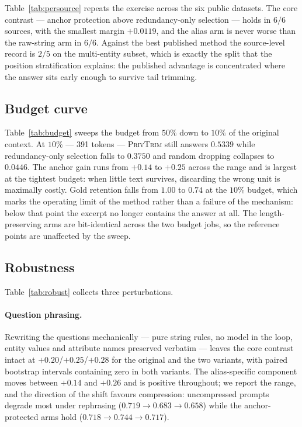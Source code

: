 \documentclass[conference]{IEEEtran}
\newcommand{\ours}{\textsc{PrivTrim}}
\begin{document}
Table~\ref{tab:persource} repeats the exercise across the six public datasets. The core
contrast --- anchor protection above redundancy-only selection --- holds in $6/6$ sources, with
the smallest margin $+0.0119$, and the alias arm is never worse than the raw-string arm in
$6/6$. Against the best published method the source-level record is $2/5$ on the multi-entity
subset, which is exactly the split that the position stratification explains: the published
advantage is concentrated where the answer sits early enough to survive tail trimming.

\subsection{Budget curve}
\label{sec:res-budget}

Table~\ref{tab:budget} sweeps the budget from $50\%$ down to $10\%$ of the original context. At
$10\%$ --- 391 tokens --- \ours{} still answers $0.5339$ while redundancy-only selection falls
to $0.3750$ and random dropping collapses to $0.0446$. The anchor gain runs from $+0.14$ to
$+0.25$ across the range and is largest at the tightest budget: when little text survives,
discarding the wrong unit is maximally costly. Gold retention falls from $1.00$ to $0.74$ at
the $10\%$ budget, which marks the operating limit of the method rather than a failure of the
mechanism: below that point the excerpt no longer contains the answer at all. The
length-preserving arms are bit-identical across the two budget jobs, so the reference points
are unaffected by the sweep.

\subsection{Robustness}
\label{sec:res-robust}

Table~\ref{tab:robust} collects three perturbations.

\paragraph{Question phrasing.}
Rewriting the questions mechanically --- pure string rules, no model in the loop, entity values
and attribute names preserved verbatim --- leaves the core contrast intact at
$+0.20$/$+0.25$/$+0.28$ for the original and the two variants, with paired bootstrap intervals
containing zero in both variants. The alias-specific component moves between $+0.14$ and
$+0.26$ and is positive throughout; we report the range, and the direction of the shift favours
compression: uncompressed prompts degrade most under rephrasing
($0.719\!\to\!0.683\!\to\!0.658$) while the anchor-protected arms hold
($0.718\!\to\!0.744\!\to\!0.717$).
\end{document}

